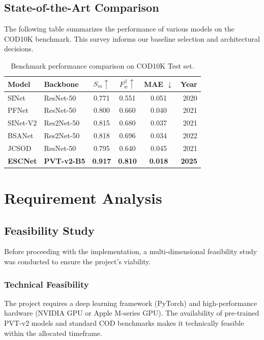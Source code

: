 \documentclass[12pt,a4paper]{report}
\begin{document}
\section{State-of-the-Art Comparison}

The following table summarizes the performance of various models on the COD10K benchmark. This survey informs our baseline selection and architectural decisions.

\begin{table}[H]
\centering
\caption{Benchmark performance comparison on COD10K Test set.}
\label{tab:survey}
\begin{tabular}{@{}llcccr@{}}
\toprule
\textbf{Model} & \textbf{Backbone} & $S_m \uparrow$ & $F_w^\beta \uparrow$ & \textbf{MAE} $\downarrow$ & \textbf{Year} \\
\midrule
SINet          & ResNet-50         & 0.771          & 0.551                & 0.051          & 2020 \\
PFNet          & ResNet-50         & 0.800          & 0.660                & 0.040          & 2021 \\
SINet-V2       & Res2Net-50        & 0.815          & 0.680                & 0.037          & 2021 \\
BSANet         & Res2Net-50        & 0.818          & 0.696                & 0.034          & 2022 \\
JCSOD          & ResNet-50         & 0.795          & 0.640                & 0.045          & 2021 \\
\textbf{ESCNet}& \textbf{PVT-v2-B5}& \textbf{0.917} & \textbf{0.810}       & \textbf{0.018} & \textbf{2025} \\
\bottomrule
\end{tabular}
\end{table}

\chapter{Requirement Analysis}\label{chap:reqanalysis}

\section{Feasibility Study}

Before proceeding with the implementation, a multi-dimensional feasibility study was conducted to ensure the project's viability.

\subsection{Technical Feasibility}
The project requires a deep learning framework (PyTorch) and high-performance hardware (NVIDIA GPU or Apple M-series GPU). The availability of pre-trained PVT-v2 models and standard COD benchmarks makes it technically feasible within the allocated timeframe.
\end{document}
